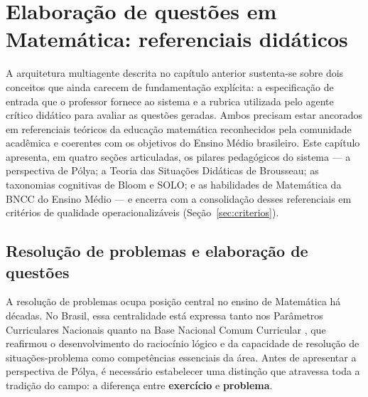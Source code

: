 \chapter{Elaboração de questões em Matemática: referenciais didáticos}
\label{cap:didatica}


A arquitetura multiagente descrita no capítulo anterior sustenta-se sobre dois conceitos que ainda
carecem de fundamentação explícita: a especificação de entrada que o professor fornece ao sistema e a
rubrica utilizada pelo agente crítico didático para avaliar as questões geradas. Ambos precisam estar
ancorados em referenciais teóricos da educação matemática reconhecidos pela comunidade acadêmica e
coerentes com os objetivos do Ensino Médio brasileiro. Este capítulo apresenta, em quatro seções
articuladas, os pilares pedagógicos do sistema --- a perspectiva de Pólya; a Teoria das Situações
Didáticas de Brousseau; as taxonomias cognitivas de Bloom e SOLO; e as habilidades de Matemática da
BNCC do Ensino Médio --- e encerra com a consolidação desses referenciais em critérios de qualidade
operacionalizáveis (Seção~\ref{sec:criterios}).

\section{Resolução de problemas e elaboração de questões}
\label{sec:resolucao}

A resolução de problemas ocupa posição central no ensino de Matemática há décadas. No Brasil, essa
centralidade está expressa tanto nos Parâmetros Curriculares Nacionais \citep{brasil1998pcn} quanto na
Base Nacional Comum Curricular \citep{brasil2018bncc}, que reafirmou o desenvolvimento do raciocínio
lógico e da capacidade de resolução de situações-problema como competências essenciais da área.
Antes de apresentar a perspectiva de Pólya, é necessário estabelecer uma distinção que atravessa toda
a tradição do campo: a diferença entre \textbf{exercício} e \textbf{problema}.

